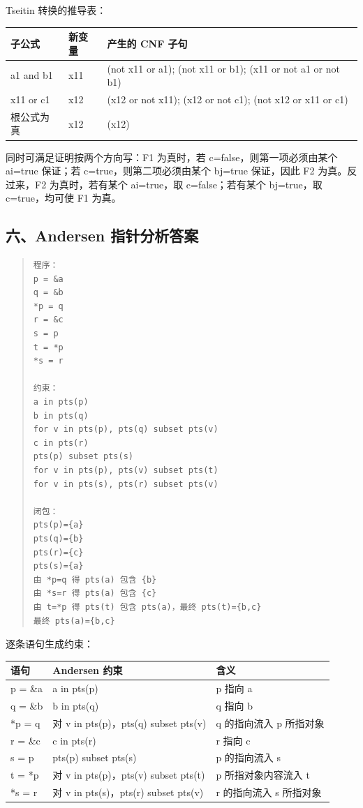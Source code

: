 \documentclass[UTF8,zihao=-4]{ctexart}
\begin{document}
Tseitin 转换的推导表：

\begin{center}
\footnotesize
\begin{tabular}{lll}
\hline
子公式 & 新变量 & 产生的 CNF 子句 \\
\hline
a1 and b1 & x11 & (not x11 or a1); (not x11 or b1); (x11 or not a1 or not b1) \\
x11 or c1 & x12 & (x12 or not x11); (x12 or not c1); (not x12 or x11 or c1) \\
根公式为真 & x12 & (x12) \\
\hline
\end{tabular}
\end{center}

同时可满足证明按两个方向写：F1 为真时，若 c=false，则第一项必须由某个 ai=true 保证；若 c=true，则第二项必须由某个 bj=true 保证，因此 F2 为真。反过来，F2 为真时，若有某个 ai=true，取 c=false；若有某个 bj=true，取 c=true，均可使 F1 为真。



\subsection{六、Andersen 指针分析答案}


\begin{quote}
\footnotesize
\begin{verbatim}
程序：
p = &a
q = &b
*p = q
r = &c
s = p
t = *p
*s = r

约束：
a in pts(p)
b in pts(q)
for v in pts(p), pts(q) subset pts(v)
c in pts(r)
pts(p) subset pts(s)
for v in pts(p), pts(v) subset pts(t)
for v in pts(s), pts(r) subset pts(v)

闭包：
pts(p)={a}
pts(q)={b}
pts(r)={c}
pts(s)={a}
由 *p=q 得 pts(a) 包含 {b}
由 *s=r 得 pts(a) 包含 {c}
由 t=*p 得 pts(t) 包含 pts(a)，最终 pts(t)={b,c}
最终 pts(a)={b,c}
\end{verbatim}
\end{quote}

逐条语句生成约束：

\begin{center}
\footnotesize
\begin{tabular}{lll}
\hline
语句 & Andersen 约束 & 含义 \\
\hline
p = \&a & a in pts(p) & p 指向 a \\
q = \&b & b in pts(q) & q 指向 b \\
*p = q & 对 v in pts(p)，pts(q) subset pts(v) & q 的指向流入 p 所指对象 \\
r = \&c & c in pts(r) & r 指向 c \\
s = p & pts(p) subset pts(s) & p 的指向流入 s \\
t = *p & 对 v in pts(p)，pts(v) subset pts(t) & p 所指对象内容流入 t \\
*s = r & 对 v in pts(s)，pts(r) subset pts(v) & r 的指向流入 s 所指对象 \\
\hline
\end{tabular}
\end{center}
\end{document}

